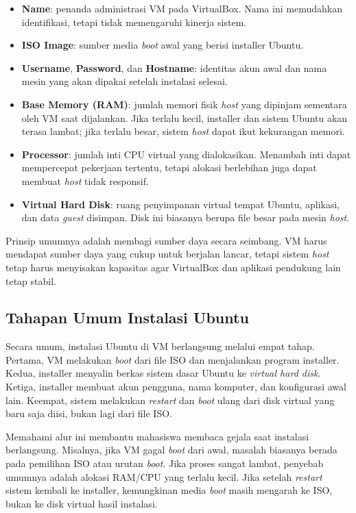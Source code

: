 \begin{itemize}
	\item \textbf{Name}: penanda administrasi VM pada VirtualBox. Nama ini memudahkan identifikasi, tetapi tidak memengaruhi kinerja sistem.
	\item \textbf{ISO Image}: sumber media \textit{boot} awal yang berisi installer Ubuntu.
	\item \textbf{Username}, \textbf{Password}, dan \textbf{Hostname}: identitas akun awal dan nama mesin yang akan dipakai setelah instalasi selesai.
	\item \textbf{Base Memory (RAM)}: jumlah memori fisik \textit{host} yang dipinjam sementara oleh VM saat dijalankan. Jika terlalu kecil, installer dan sistem Ubuntu akan terasa lambat; jika terlalu besar, sistem \textit{host} dapat ikut kekurangan memori.
	\item \textbf{Processor}: jumlah inti CPU virtual yang dialokasikan. Menambah inti dapat mempercepat pekerjaan tertentu, tetapi alokasi berlebihan juga dapat membuat \textit{host} tidak responsif.
	\item \textbf{Virtual Hard Disk}: ruang penyimpanan virtual tempat Ubuntu, aplikasi, dan data \textit{guest} disimpan. Disk ini biasanya berupa file besar pada mesin \textit{host}.
\end{itemize}

Prinsip umumnya adalah membagi sumber daya secara seimbang. VM harus mendapat sumber daya yang cukup untuk berjalan lancar, tetapi sistem \textit{host} tetap harus menyisakan kapasitas agar VirtualBox dan aplikasi pendukung lain tetap stabil.

\subsection{Tahapan Umum Instalasi Ubuntu}
Secara umum, instalasi Ubuntu di VM berlangsung melalui empat tahap. Pertama, VM melakukan \textit{boot} dari file ISO dan menjalankan program installer. Kedua, installer menyalin berkas sistem dasar Ubuntu ke \textit{virtual hard disk}. Ketiga, installer membuat akun pengguna, nama komputer, dan konfigurasi awal lain. Keempat, sistem melakukan \textit{restart} dan \textit{boot} ulang dari disk virtual yang baru saja diisi, bukan lagi dari file ISO.

Memahami alur ini membantu mahasiswa membaca gejala saat instalasi berlangsung. Misalnya, jika VM gagal \textit{boot} dari awal, masalah biasanya berada pada pemilihan ISO atau urutan \textit{boot}. Jika proses sangat lambat, penyebab umumnya adalah alokasi RAM/CPU yang terlalu kecil. Jika setelah \textit{restart} sistem kembali ke installer, kemungkinan media \textit{boot} masih mengarah ke ISO, bukan ke disk virtual hasil instalasi.

